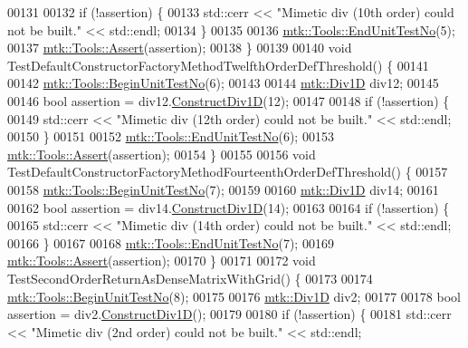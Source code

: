 \begin{DoxyCode}
00131 
00132   \textcolor{keywordflow}{if} (!assertion) \{
00133     std::cerr << \textcolor{stringliteral}{"Mimetic div (10th order) could not be built."} << std::endl;
00134   \}
00135 
00136   \hyperlink{classmtk_1_1Tools_ad8cf0085133dd40c913fe195bc5b9694}{mtk::Tools::EndUnitTestNo}(5);
00137   \hyperlink{classmtk_1_1Tools_aa311fada9255627d06c56b1e4fedce9e}{mtk::Tools::Assert}(assertion);
00138 \}
00139 
00140 \textcolor{keywordtype}{void} TestDefaultConstructorFactoryMethodTwelfthOrderDefThreshold() \{
00141 
00142   \hyperlink{classmtk_1_1Tools_a26ee906d28523378522a75e25c3a4e19}{mtk::Tools::BeginUnitTestNo}(6);
00143 
00144   \hyperlink{classmtk_1_1Div1D}{mtk::Div1D} div12;
00145 
00146   \textcolor{keywordtype}{bool} assertion = div12.\hyperlink{classmtk_1_1Div1D_a52fcd1542f11e606e36bd188e48bfdf7}{ConstructDiv1D}(12);
00147 
00148   \textcolor{keywordflow}{if} (!assertion) \{
00149     std::cerr << \textcolor{stringliteral}{"Mimetic div (12th order) could not be built."} << std::endl;
00150   \}
00151 
00152   \hyperlink{classmtk_1_1Tools_ad8cf0085133dd40c913fe195bc5b9694}{mtk::Tools::EndUnitTestNo}(6);
00153   \hyperlink{classmtk_1_1Tools_aa311fada9255627d06c56b1e4fedce9e}{mtk::Tools::Assert}(assertion);
00154 \}
00155 
00156 \textcolor{keywordtype}{void} TestDefaultConstructorFactoryMethodFourteenthOrderDefThreshold() \{
00157 
00158   \hyperlink{classmtk_1_1Tools_a26ee906d28523378522a75e25c3a4e19}{mtk::Tools::BeginUnitTestNo}(7);
00159 
00160   \hyperlink{classmtk_1_1Div1D}{mtk::Div1D} div14;
00161 
00162   \textcolor{keywordtype}{bool} assertion = div14.\hyperlink{classmtk_1_1Div1D_a52fcd1542f11e606e36bd188e48bfdf7}{ConstructDiv1D}(14);
00163 
00164   \textcolor{keywordflow}{if} (!assertion) \{
00165     std::cerr << \textcolor{stringliteral}{"Mimetic div (14th order) could not be built."} << std::endl;
00166   \}
00167 
00168   \hyperlink{classmtk_1_1Tools_ad8cf0085133dd40c913fe195bc5b9694}{mtk::Tools::EndUnitTestNo}(7);
00169   \hyperlink{classmtk_1_1Tools_aa311fada9255627d06c56b1e4fedce9e}{mtk::Tools::Assert}(assertion);
00170 \}
00171 
00172 \textcolor{keywordtype}{void} TestSecondOrderReturnAsDenseMatrixWithGrid() \{
00173 
00174   \hyperlink{classmtk_1_1Tools_a26ee906d28523378522a75e25c3a4e19}{mtk::Tools::BeginUnitTestNo}(8);
00175 
00176   \hyperlink{classmtk_1_1Div1D}{mtk::Div1D} div2;
00177 
00178   \textcolor{keywordtype}{bool} assertion = div2.\hyperlink{classmtk_1_1Div1D_a52fcd1542f11e606e36bd188e48bfdf7}{ConstructDiv1D}();
00179 
00180   \textcolor{keywordflow}{if} (!assertion) \{
00181     std::cerr << \textcolor{stringliteral}{"Mimetic div (2nd order) could not be built."} << std::endl;

\end{DoxyCode}
